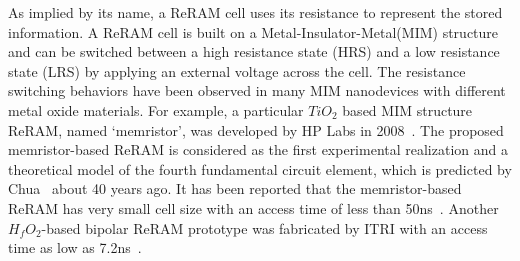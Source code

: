 
As implied by its name, a ReRAM cell uses its resistance to represent the
stored information. A ReRAM cell is built on a Metal-Insulator-Metal(MIM)
structure and can be switched between a high resistance state (HRS) and a
low resistance state (LRS) by applying an external voltage across the
cell. The resistance switching behaviors have been observed in many MIM
nanodevices with different metal oxide materials. For example, a
particular $TiO_2$ based MIM structure ReRAM, named `memristor', was
developed by HP Labs in 2008~\cite{memristor:missing}. The proposed
memristor-based ReRAM is considered as the first experimental realization
and a theoretical model of the fourth fundamental circuit element, which
is predicted by Chua~\cite{memristor:chua} about 40 years ago. It has been
reported that the memristor-based ReRAM has very small cell size with an
access time of less than 50ns~\cite{memristor:switch}.
Another $H_fO_2$-based bipolar ReRAM prototype was fabricated by ITRI with
an access time as low as 7.2ns~\cite{ReRAM_ISSCC2011_Sheu}.


